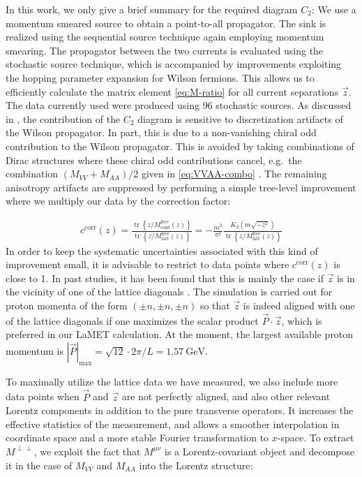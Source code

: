 \documentclass[floatfix,twocolumn,prl,showpacs,preprintnumbers,amsmath,nofootinbib,amssymb,noeprint,superscriptaddress]{revtex4-1}
\newcommand{\tr}{\operatorname{tr}}
\begin{document}
In this work, we only give a brief summary for the required diagram $C_2$: We use a momentum smeared source \cite{Bali:2016lva} to obtain a point-to-all propagator. The sink is realized using the sequential source technique again employing momentum smearing.
The propagator between the two currents is evaluated using the stochastic source technique, which is accompanied by improvements exploiting the hopping parameter expansion for Wilson fermions. This allows us to efficiently calculate the matrix element \eqref{eq:M-ratio} for all current separations $\vec{z}$. The data currently used were produced using 96 stochastic sources. As discussed in \cite{Zimmermann:2024zde}, the contribution of the $C_2$ diagram is sensitive to discretization artifacts of the Wilson propagator. In part, this is due to a non-vanishing chiral odd contribution to the Wilson propagator. This is avoided by taking combinations of Dirac structures where these chiral odd contributions cancel, e.g.\ the combination $(M_{VV}+M_{AA})/2$ given in \eqref{eq:VVAA-combo} \cite{Bali:2018spj,Zimmermann:2024zde}. The remaining anisotropy artifacts are suppressed by performing a simple tree-level improvement where we multiply our data by the correction factor:

\begin{align}
    c^{\mathrm{corr}}(z) 
    =
    \frac{\tr\left\{ z\!\!\!/ M^{\mathrm{free}}_{\mathrm{cont}}(z) \right\}}{\tr\left\{ z\!\!\!/ M^{\mathrm{free}}_{\mathrm{latt}}(z) \right\}}
    = 
    -\frac{m^2}{\pi^2} \frac{K_2(m\sqrt{-z^2}) }{ \tr\left\{ z\!\!\!/ M^{\mathrm{free}}_{\mathrm{latt}}(z) \right\} }
\end{align}
%
In order to keep the systematic uncertainties associated with this kind of improvement small, it is advisable to restrict to data points where $c^{\mathrm{corr}}(z)$ is close to 1. In past studies, it has been found  that this is mainly the case if $\vec{z}$ is in the vicinity of one of the lattice diagonals \cite{Bali:2018spj,Zimmermann:2024zde}. The simulation is carried out for proton momenta of the form $(\pm n,\pm n,\pm n)$ so that $\vec{z}$ is indeed aligned with one of the lattice diagonals if one maximizes the scalar product $\vec{P}\cdot \vec{z}$, which is preferred in our LaMET calculation. At the moment, the largest available proton momentum is $|\vec{P}|_{\mathrm{max}} = \sqrt{12}\cdot 2\pi/L = 1.57~\mathrm{GeV}$. 


To maximally utilize the lattice data we have measured, we also include more data points when $\vec{P}$ and $\vec{z}$ are not perfectly aligned, and also other relevant Lorentz components in addition to the pure transverse operators. It increases the effective statistics of the measurement, and allows a smoother interpolation in coordinate space and a more stable Fourier transformation to $x$-space. To extract $M^{\perp\perp}$, we exploit the fact that $M^{\mu\nu}$ is a Lorentz-covariant object and decompose it in the case of $M_{VV}$ and $M_{AA}$ into the Lorentz structure:
\end{document}
